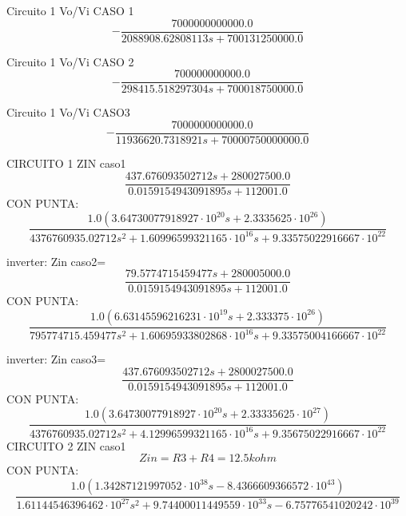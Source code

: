Circuito 1 Vo/Vi CASO 1
\begin{equation}
- \frac{7000000000000.0}{2088908.62808113 s + 700131250000.0}
\end{equation}

Circuito 1 Vo/Vi CASO 2
\begin{equation}
- \frac{700000000000.0}{298415.518297304 s + 700018750000.0}
\end{equation}

Circuito 1 Vo/Vi CASO3
\begin{equation}
- \frac{7000000000000.0}{11936620.7318921 s + 70000750000000.0}
\end{equation}

CIRCUITO 1 ZIN
caso1
\begin{equation}
\frac{437.676093502712 s + 280027500.0}{0.0159154943091895 s + 112001.0}
\end{equation}
CON PUNTA:
\begin{equation}
\frac{1.0 \left(3.64730077918927 \cdot 10^{20} s + 2.3335625 \cdot 10^{26}\right)}{4376760935.02712 s^{2} + 1.60996599321165 \cdot 10^{16} s + 9.33575022916667 \cdot 10^{22}}
\end{equation}

inverter: Zin caso2=
\begin{equation}
\frac{79.5774715459477 s + 280005000.0}{0.0159154943091895 s + 112001.0}
\end{equation}
CON PUNTA:
\begin{equation}
\frac{1.0 \left(6.63145596216231 \cdot 10^{19} s + 2.333375 \cdot 10^{26}\right)}{795774715.459477 s^{2} + 1.60695933802868 \cdot 10^{16} s + 9.33575004166667 \cdot 10^{22}}
\end{equation}

inverter: Zin caso3=
\begin{equation}
\frac{437.676093502712 s + 2800027500.0}{0.0159154943091895 s + 112001.0}
\end{equation}
CON PUNTA:
\begin{equation}
\frac{1.0 \left(3.64730077918927 \cdot 10^{20} s + 2.33335625 \cdot 10^{27}\right)}{4376760935.02712 s^{2} + 4.12996599321165 \cdot 10^{16} s + 9.35675022916667 \cdot 10^{22}}
\end{equation}
CIRCUITO 2
ZIN
caso1
\begin{equation}
Zin = R3 + R4 = 12.5kohm
\end{equation}
CON PUNTA:
\begin{equation}
\frac{1.0 \left(1.34287121997052 \cdot 10^{38} s - 8.4366609366572 \cdot 10^{43}\right)}{1.61144546396462 \cdot 10^{27} s^{2} + 9.74400011449559 \cdot 10^{33} s - 6.75776541020242 \cdot 10^{39}}
\end{equation}

